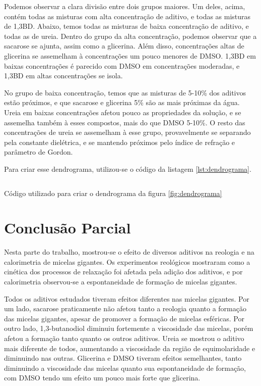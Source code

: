 		Podemos observar a clara divisão entre dois grupos maiores. Um deles, acima, contém todas as misturas com alta concentração de aditivo, e todas as misturas de 1,3BD. Abaixo, temos todas as misturas de baixa concentração de aditivo, e todas as de ureia. Dentro do grupo da alta concentração, podemos observar que a sacarose se ajunta, assim como a glicerina. Além disso, concentrações altas de glicerina se assemelham à concentrações um pouco menores de DMSO. 1,3BD em baixas concentrações é parecido com DMSO em concentrações moderadas, e 1,3BD em altas concentrações se isola.
		
		No grupo de baixa concentração, temos que as misturas de 5-10\% dos aditivos estão próximos, e que sacarose e glicerina 5\% são as mais próximas da água. Ureia em baixas concentrações afetou pouco as propriedades da solução, e se assemelha também à esses compostos, mais do que DMSO 5-10\%. O resto das concentrações de ureia se assemelham à esse grupo, provavelmente se separando pela constante dielétrica, e se mantendo próximos pelo índice de refração e parâmetro de Gordon.
		
		Para criar esse dendrograma, utilizou-se o código da listagem \ref{lst:dendrograma}.
		
		\begin{listing}[h]
			\inputminted{python}{./python/dendrograma.py}
			\caption{Código utilizado para criar o dendrograma da figura \ref{fig:dendrograma}}
			\label{lst:dendrograma}
		\end{listing}
		\FloatBarrier
		
		
		\section{Conclusão Parcial}
		
		Nesta parte do trabalho, mostrou-se o efeito de diversos aditivos na reologia e na calorimetria de micelas gigantes. Os experimentos reológicos mostraram como a cinética dos processos de relaxação foi afetada pela adição dos aditivos, e por calorimetria observou-se a espontaneidade de formação de micelas gigantes.
		
		Todos os aditivos estudados tiveram efeitos diferentes nas micelas gigantes. Por um lado, sacarose praticamente não afetou tanto a reologia quanto a formação das micelas gigantes, apesar de promover a formação de micelas esféricas. Por outro lado, 1,3-butanodiol diminuiu fortemente a viscosidade das micelas, porém afetou a formação tanto quanto os outros aditivos. Ureia se mostrou o aditivo mais diferente de todos, aumentando a viscosidade da região de equimolaridade e diminuindo nas outras. Glicerina e DMSO tiveram efeitos semelhantes, tanto diminuindo a viscosidade das micelas quanto sua espontaneidade de formação, com DMSO tendo um efeito um pouco mais forte que glicerina.
		
